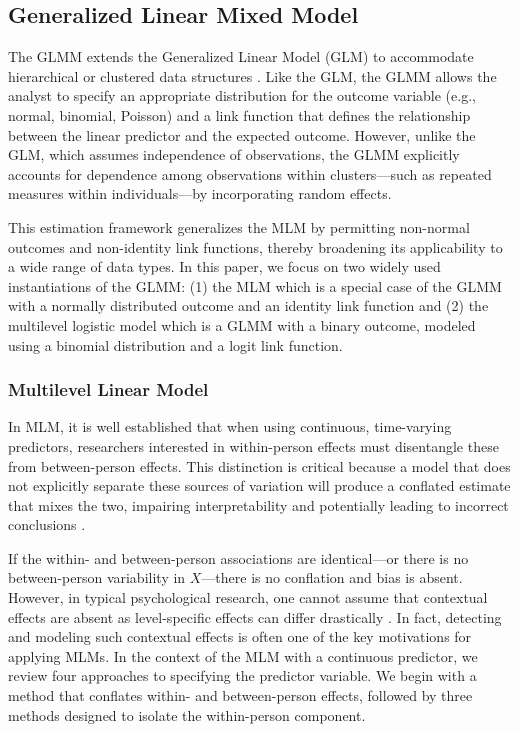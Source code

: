 \documentclass[stu]{apa7}
\begin{document}
\subsection{Generalized Linear Mixed Model}

The GLMM extends the Generalized Linear Model (GLM) to accommodate hierarchical or clustered data structures \parencite[]{stroup_generalized_2012, breslow_approximate_1993, hoffman_longitudinal_2015}. Like the GLM, the GLMM allows the analyst to specify an appropriate distribution for the outcome variable (e.g., normal, binomial, Poisson) and a link function that defines the relationship between the linear predictor and the expected outcome. However, unlike the GLM, which assumes independence of observations, the GLMM explicitly accounts for dependence among observations within clusters—such as repeated measures within individuals—by incorporating random effects.

This estimation framework generalizes the MLM by permitting non-normal outcomes and non-identity link functions, thereby broadening its applicability to a wide range of data types. In this paper, we focus on two widely used instantiations of the GLMM: (1) the MLM which is a special case of the GLMM with a normally distributed outcome and an identity link function and (2) the multilevel logistic model which is a GLMM with a binary outcome, modeled using a binomial distribution and a logit link function.

\subsubsection{Multilevel Linear Model}

In MLM, it is well established that when using continuous, time-varying predictors, researchers interested in within-person effects must disentangle these from between-person effects. This distinction is critical because a model that does not explicitly separate these sources of variation will produce a conflated estimate that mixes the two, impairing interpretability and potentially leading to incorrect conclusions \parencite[e.g.,][]{enders_centering_2007, kreft_effect_1995, raudenbush_hierarchical_2002}.

If the within- and between-person associations are identical—or there is no between-person variability in $X$---there is no conflation and bias is absent. However, in typical psychological research, one cannot assume that contextual effects are absent as level-specific effects can differ drastically \parencite[]{curran_disaggregation_2011, robinson_ecological_1950}. In fact, detecting and modeling such contextual effects is often one of the key motivations for applying MLMs. In the context of the MLM with a continuous predictor, we review four approaches to specifying the predictor variable. We begin with a method that conflates within- and between-person effects, followed by three methods designed to isolate the within-person component. 
\end{document}
